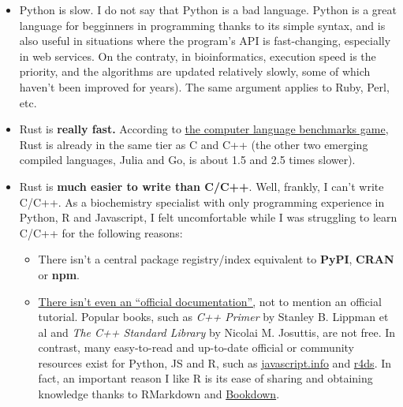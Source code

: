 \documentclass[
]{book}
\providecommand{\tightlist}{%
  \setlength{\itemsep}{0pt}\setlength{\parskip}{0pt}}
\begin{document}
\begin{itemize}
\item
  Python is slow. I do not say that Python is a bad language. Python is a great language for begginners in programming thanks to its simple syntax, and is also useful in situations where the program's API is fast-changing, especially in web services. On the contraty, in bioinformatics, execution speed is the priority, and the algorithms are updated relatively slowly, some of which haven't been improved for years). The same argument applies to Ruby, Perl, etc.
\item
  Rust is \textbf{really fast.} According to \href{https://benchmarksgame-team.pages.debian.net/benchmarksgame/which-programs-are-fastest.html}{the computer language benchmarks game}, Rust is already in the same tier as C and C++ (the other two emerging compiled languages, Julia and Go, is about 1.5 and 2.5 times slower).
\item
  Rust is \textbf{much easier to write than C/C++}. Well, frankly, I can't write C/C++. As a biochemistry specialist with only programming experience in Python, R and Javascript, I felt uncomfortable while I was struggling to learn C/C++ for the following reasons:

  \begin{itemize}
  \tightlist
  \item
    There isn't a central package registry/index equivalent to \textbf{PyPI}, \textbf{CRAN} or \textbf{npm}.
  \item
    \href{https://stackoverflow.com/questions/34967756/where-is-the-official-c-documentation\#:~:text=C\%2B\%2B\%20is\%20not\%20a\%20product\%20and\%20there\%20is,etc.\%29.\%20–\%20sorush-r\%20Jan\%2023\%20\%2716\%20at\%2019\%3A28}{There isn't even an ``official documentation'',} not to mention an official tutorial. Popular books, such as \emph{C++ Primer} by Stanley B. Lippman et al and \emph{The C++ Standard Library} by Nicolai M. Josuttis, are not free. In contrast, many easy-to-read and up-to-date official or community resources exist for Python, JS and R, such as \href{https://javascript.info}{javascript.info} and \href{https://r4ds.had.co.nz}{r4ds}. In fact, an important reason I like R is its ease of sharing and obtaining knowledge thanks to RMarkdown and \href{https://bookdown.org}{Bookdown}.
  \end{itemize}


\end{itemize}
\end{document}

